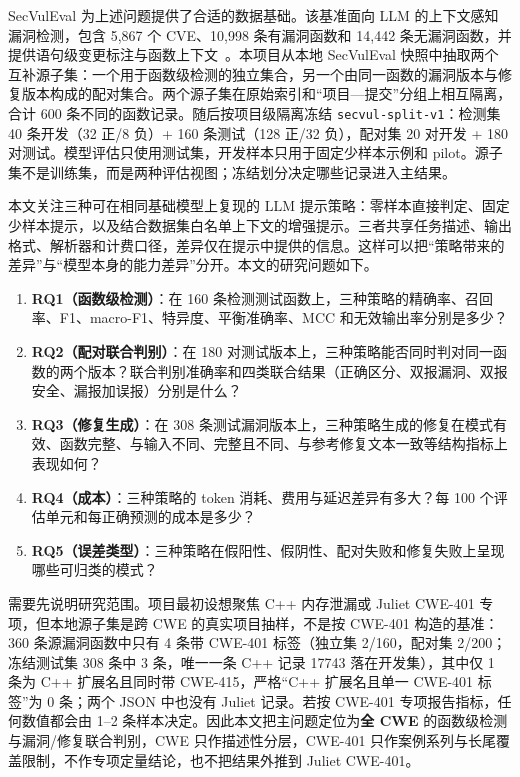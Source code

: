 \documentclass[conference]{IEEEtran}
\begin{document}
SecVulEval 为上述问题提供了合适的数据基础。该基准面向 LLM 的上下文感知漏洞检测，包含 5{,}867 个 CVE、10{,}998 条有漏洞函数和 14{,}442 条无漏洞函数，并提供语句级变更标注与函数上下文~\cite{ahmed2026secvuleval,secvulevaldata}。本项目从本地 SecVulEval 快照中抽取两个互补源子集：一个用于函数级检测的独立集合，另一个由同一函数的漏洞版本与修复版本构成的配对集合。两个源子集在原始索引和“项目—提交”分组上相互隔离，合计 600 条不同的函数记录。随后按项目级隔离冻结 \texttt{secvul-split-v1}：检测集 40 条开发（32 正/8 负）+ 160 条测试（128 正/32 负），配对集 20 对开发 + 180 对测试。模型评估只使用测试集，开发样本只用于固定少样本示例和 pilot。源子集不是训练集，而是两种评估视图；冻结划分决定哪些记录进入主结果。

本文关注三种可在相同基础模型上复现的 LLM 提示策略：零样本直接判定、固定少样本提示，以及结合数据集白名单上下文的增强提示。三者共享任务描述、输出格式、解析器和计费口径，差异仅在提示中提供的信息。这样可以把“策略带来的差异”与“模型本身的能力差异”分开。本文的研究问题如下。

\begin{enumerate}
    \item \textbf{RQ1（函数级检测）}：在 160 条检测测试函数上，三种策略的精确率、召回率、F1、macro-F1、特异度、平衡准确率、MCC 和无效输出率分别是多少？
    \item \textbf{RQ2（配对联合判别）}：在 180 对测试版本上，三种策略能否同时判对同一函数的两个版本？联合判别准确率和四类联合结果（正确区分、双报漏洞、双报安全、漏报加误报）分别是什么？
    \item \textbf{RQ3（修复生成）}：在 308 条测试漏洞版本上，三种策略生成的修复在模式有效、函数完整、与输入不同、完整且不同、与参考修复文本一致等结构指标上表现如何？
    \item \textbf{RQ4（成本）}：三种策略的 token 消耗、费用与延迟差异有多大？每 100 个评估单元和每正确预测的成本是多少？
    \item \textbf{RQ5（误差类型）}：三种策略在假阳性、假阴性、配对失败和修复失败上呈现哪些可归类的模式？
\end{enumerate}

需要先说明研究范围。项目最初设想聚焦 C++ 内存泄漏或 Juliet CWE-401 专项，但本地源子集是跨 CWE 的真实项目抽样，不是按 CWE-401 构造的基准：360 条源漏洞函数中只有 4 条带 CWE-401 标签（独立集 2/160，配对集 2/200；冻结测试集 308 条中 3 条，唯一一条 C++ 记录 17743 落在开发集），其中仅 1 条为 C++ 扩展名且同时带 CWE-415，严格“C++ 扩展名且单一 CWE-401 标签”为 0 条；两个 JSON 中也没有 Juliet 记录。若按 CWE-401 专项报告指标，任何数值都会由 1--2 条样本决定。因此本文把主问题定位为\textbf{全 CWE} 的函数级检测与漏洞/修复联合判别，CWE 只作描述性分层，CWE-401 只作案例系列与长尾覆盖限制，不作专项定量结论，也不把结果外推到 Juliet CWE-401。
\end{document}
